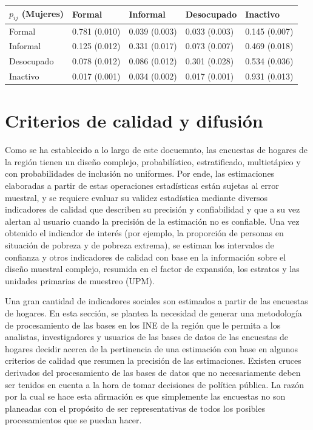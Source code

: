 \documentclass[
  12pt,
  spanish,
]{book}
\begin{document}
\begin{longtable}[]{@{}lllll@{}}
\toprule
\(p_{ij}\) (Mujeres) & Formal & Informal & Desocupado & Inactivo \\
\midrule
\endhead
Formal & 0.781 (0.010) & 0.039 (0.003) & 0.033 (0.003) & 0.145 (0.007) \\
Informal & 0.125 (0.012) & 0.331 (0.017) & 0.073 (0.007) & 0.469 (0.018) \\
Desocupado & 0.078 (0.012) & 0.086 (0.012) & 0.301 (0.028) & 0.534 (0.036) \\
Inactivo & 0.017 (0.001) & 0.034 (0.002) & 0.017 (0.001) & 0.931 (0.013) \\
\bottomrule
\end{longtable}

\hypertarget{criterios-de-calidad-y-difusiuxf3n}{%
\chapter{Criterios de calidad y difusión}\label{criterios-de-calidad-y-difusiuxf3n}}

Como se ha establecido a lo largo de este docuemnto, las encuestas de hogares de la región tienen un diseño complejo, probabilístico, estratificado, multietápico y con probabilidades de inclusión no uniformes. Por ende, las estimaciones elaboradas a partir de estas operaciones estadísticas están sujetas al error muestral, y se requiere evaluar su validez estadística mediante diversos indicadores de calidad que describen su precisión y confiabilidad y que a su vez alertan al usuario cuando la precisión de la estimación no es confiable. Una vez obtenido el indicador de interés (por ejemplo, la proporción de personas en situación de pobreza y de pobreza extrema), se estiman los intervalos de confianza y otros indicadores de calidad con base en la información sobre el diseño muestral complejo, resumida en el factor de expansión, los estratos y las unidades primarias de muestreo (UPM).

Una gran cantidad de indicadores sociales son estimados a partir de las encuestas de hogares. En esta sección, se plantea la necesidad de generar una metodología de procesamiento de las bases en los INE de la región que le permita a los analistas, investigadores y usuarios de las bases de datos de las encuestas de hogares decidir acerca de la pertinencia de una estimación con base en algunos criterios de calidad que resumen la precisión de las estimaciones. Existen cruces derivados del procesamiento de las bases de datos que no necesariamente deben ser tenidos en cuenta a la hora de tomar decisiones de política pública. La razón por la cual se hace esta afirmación es que simplemente las encuestas no son planeadas con el propósito de ser representativas de todos los posibles procesamientos que se puedan hacer.
\end{document}
